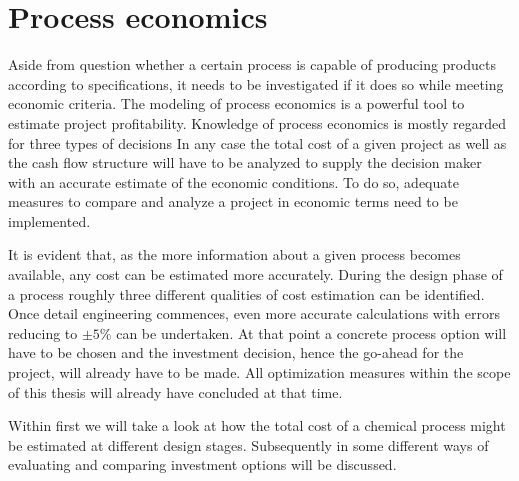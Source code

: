 \chapter{Process economics}
\label{chp:ProcesEconomics}
    Aside from question whether a certain process is capable of producing products according to
    specifications, it needs to be investigated if it does so while meeting economic criteria. The modeling
    of process economics is a powerful tool to estimate project profitability. Knowledge of process economics
    is mostly regarded for three types of decisions
    In any case the total cost of a given project as well as the cash flow structure will have to be analyzed to supply
    the decision maker with an accurate estimate of the economic conditions. To do so, adequate measures to compare and
    analyze a project in economic terms need to be implemented.
    
    It is evident that, as the more information about a given process becomes available, any cost can be estimated
    more accurately. During the design phase of a process roughly three different qualities of cost estimation can be identified.
    Once detail engineering commences, even more accurate calculations with errors reducing to $\pm 5\%$
    can be undertaken\cite{Peters.2003}. At that point a concrete process option will have to be chosen and
    the investment decision, hence the go-ahead for the project,  will already have to be made. All optimization
    measures within the scope of this thesis will already have concluded at that time.
    
    Within  first we will take a look at how the total cost of a chemical process might be
    estimated at different design stages. Subsequently in  some different ways
    of evaluating and comparing investment options will be discussed.

